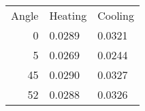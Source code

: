 \begin{tabular}{r | l l}
Angle & Heating & Cooling\\
0 & 0.0289 & 0.0321\\
5 & 0.0269 & 0.0244\\
45 & 0.0290 & 0.0327\\
52 & 0.0288 & 0.0326\\
\end{tabular}

